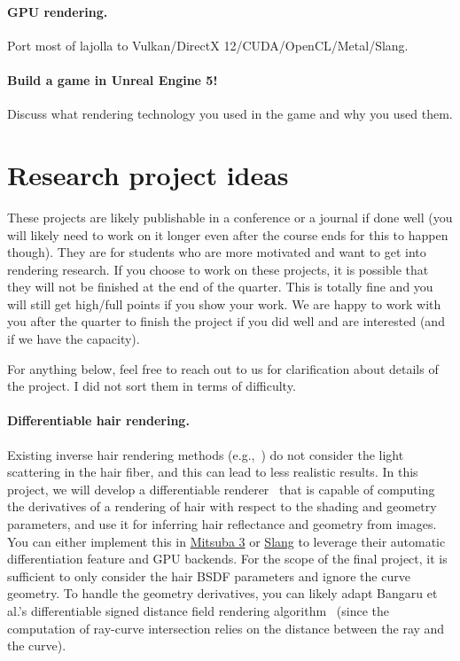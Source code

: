 \paragraph{GPU rendering.}
Port most of lajolla to Vulkan/DirectX 12/CUDA/OpenCL/Metal/Slang.

\paragraph{Build a game in Unreal Engine 5!}
Discuss what rendering technology you used in the game and why you used them.

\section{Research project ideas}
These projects are likely publishable in a conference or a journal if done well (you will likely need to work on it longer even after the course ends for this to happen though).
They are for students who are more motivated and want to get into rendering research.
If you choose to work on these projects, it is possible that they will not be finished at the end of the quarter. This is totally fine and you will still get high/full points if you show your work.
We are happy to work with you after the quarter to finish the project if you did well and are interested (and if we have the capacity).

For anything below, feel free to reach out to us for clarification about details of the project.
I did not sort them in terms of difficulty.

\paragraph{Differentiable hair rendering.}
Existing inverse hair rendering methods (e.g.,~\cite{Rosu:2022:NSL}) do not consider the light scattering in the hair fiber, and this can lead to less realistic results.
In this project, we will develop a differentiable renderer~\cite{Li:2018:DMC} that is capable of computing the derivatives of a rendering of hair with respect to the shading and geometry parameters, and use it for inferring hair reflectance and geometry from images.
You can either implement this in \href{https://github.com/mitsuba-renderer/mitsuba3}{Mitsuba 3} or \href{https://developer.nvidia.com/blog/differentiable-slang-example-applications/}{Slang} to leverage their automatic differentiation feature and GPU backends.
For the scope of the final project, it is sufficient to only consider the hair BSDF parameters and ignore the curve geometry.
To handle the geometry derivatives, you can likely adapt Bangaru et al.'s differentiable signed distance field rendering algorithm~\cite{Bangaru:2022:DRN} (since the computation of ray-curve intersection relies on the distance between the ray and the curve).


